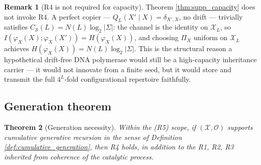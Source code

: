\documentclass[11pt]{article}
\theoremstyle{plain}
\newtheorem{theorem}{Theorem}
\theoremstyle{definition}
\newtheorem{remark}[theorem]{Remark}
\newcommand{\Csub}{C_{\mathcal{S}}}
\newcommand{\descX}{\varphi_X}
\newcommand{\Xset}{\mathcal{X}}
\newcommand{\Op}{\mathcal{O}}
\begin{document}
\begin{remark}[R4 is not required for capacity]
\label{rem:no_R4_for_capacity}
Theorem \ref{thm:supp_capacity} does not invoke R4. A perfect copier --- $Q_L(X' \mid X) = \delta_{X', X}$, no drift --- trivially satisfies $\Csub(L) = N(L) \log_2 |\Sigma|$: the channel is the identity on $\Xset_L$, so $I(\descX(X); \descX(X')) = H(\descX(X))$, and choosing $\Pi_X$ uniform on $\Xset_L$ achieves $H(\descX(X)) = N(L) \log_2 |\Sigma|$. This is the structural reason a hypothetical drift-free DNA polymerase would still be a high-capacity inheritance carrier --- it would not innovate from a finite seed, but it would store and transmit the full $4^L$-fold configurational repertoire faithfully.
\end{remark}

\subsection{Generation theorem}
\label{subsec:generation_thm}

\begin{theorem}[Generation necessity]
\label{thm:supp_generation}
Within the (R5) scope, if $(\Xset, \Op)$ supports cumulative generative recursion in the sense of Definition \ref{def:cumulative_generation}, then R4 holds, in addition to the R1, R2, R3 inherited from coherence of the catalytic process.
\end{theorem}
\end{document}
